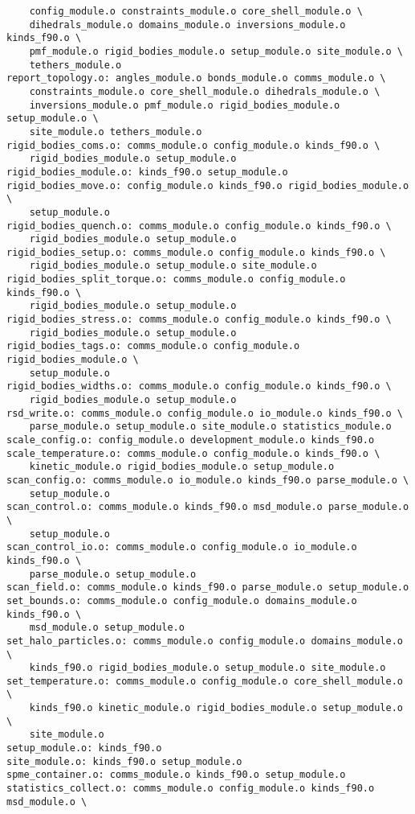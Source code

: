 \begin{verbatim}
	config_module.o constraints_module.o core_shell_module.o \
	dihedrals_module.o domains_module.o inversions_module.o kinds_f90.o \
	pmf_module.o rigid_bodies_module.o setup_module.o site_module.o \
	tethers_module.o
report_topology.o: angles_module.o bonds_module.o comms_module.o \
	constraints_module.o core_shell_module.o dihedrals_module.o \
	inversions_module.o pmf_module.o rigid_bodies_module.o setup_module.o \
	site_module.o tethers_module.o
rigid_bodies_coms.o: comms_module.o config_module.o kinds_f90.o \
	rigid_bodies_module.o setup_module.o
rigid_bodies_module.o: kinds_f90.o setup_module.o
rigid_bodies_move.o: config_module.o kinds_f90.o rigid_bodies_module.o \
	setup_module.o
rigid_bodies_quench.o: comms_module.o config_module.o kinds_f90.o \
	rigid_bodies_module.o setup_module.o
rigid_bodies_setup.o: comms_module.o config_module.o kinds_f90.o \
	rigid_bodies_module.o setup_module.o site_module.o
rigid_bodies_split_torque.o: comms_module.o config_module.o kinds_f90.o \
	rigid_bodies_module.o setup_module.o
rigid_bodies_stress.o: comms_module.o config_module.o kinds_f90.o \
	rigid_bodies_module.o setup_module.o
rigid_bodies_tags.o: comms_module.o config_module.o rigid_bodies_module.o \
	setup_module.o
rigid_bodies_widths.o: comms_module.o config_module.o kinds_f90.o \
	rigid_bodies_module.o setup_module.o
rsd_write.o: comms_module.o config_module.o io_module.o kinds_f90.o \
	parse_module.o setup_module.o site_module.o statistics_module.o
scale_config.o: config_module.o development_module.o kinds_f90.o
scale_temperature.o: comms_module.o config_module.o kinds_f90.o \
	kinetic_module.o rigid_bodies_module.o setup_module.o
scan_config.o: comms_module.o io_module.o kinds_f90.o parse_module.o \
	setup_module.o
scan_control.o: comms_module.o kinds_f90.o msd_module.o parse_module.o \
	setup_module.o
scan_control_io.o: comms_module.o config_module.o io_module.o kinds_f90.o \
	parse_module.o setup_module.o
scan_field.o: comms_module.o kinds_f90.o parse_module.o setup_module.o
set_bounds.o: comms_module.o config_module.o domains_module.o kinds_f90.o \
	msd_module.o setup_module.o
set_halo_particles.o: comms_module.o config_module.o domains_module.o \
	kinds_f90.o rigid_bodies_module.o setup_module.o site_module.o
set_temperature.o: comms_module.o config_module.o core_shell_module.o \
	kinds_f90.o kinetic_module.o rigid_bodies_module.o setup_module.o \
	site_module.o
setup_module.o: kinds_f90.o
site_module.o: kinds_f90.o setup_module.o
spme_container.o: comms_module.o kinds_f90.o setup_module.o
statistics_collect.o: comms_module.o config_module.o kinds_f90.o msd_module.o \

\end{verbatim}
